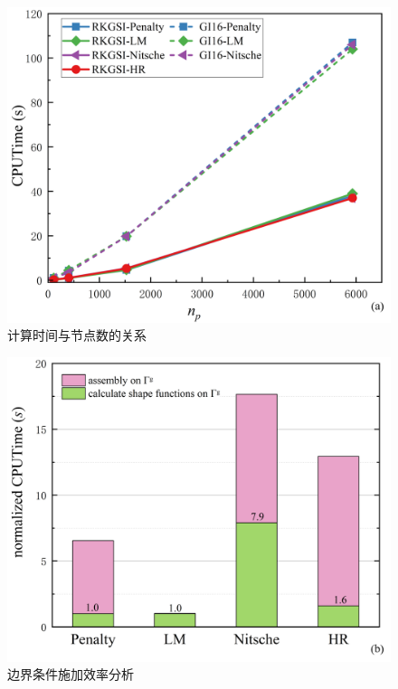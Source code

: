 \begin{figure}[H]
    \centering
    \includegraphics[scale=0.5]{figure/EHR/hole/cputime.png}
    \caption{计算时间与节点数的关系}\label{Hcputime}
\end{figure}
\newpage
\begin{figure}[H]
    \centering
    \includegraphics[scale=0.5]{figure/EHR/hole/efficiency.png}
    \caption{边界条件施加效率分析}\label{Hefficiency}
\end{figure}
